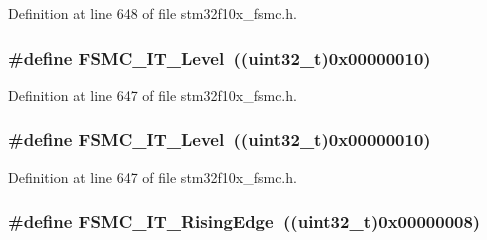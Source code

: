 Definition at line 648 of file stm32f10x\+\_\+fsmc.\+h.

\subsubsection[{\texorpdfstring{F\+S\+M\+C\+\_\+\+I\+T\+\_\+\+Level}{FSMC_IT_Level}}]{\setlength{\rightskip}{0pt plus 5cm}\#define F\+S\+M\+C\+\_\+\+I\+T\+\_\+\+Level~(({\bf uint32\+\_\+t})0x00000010)}\hypertarget{group___f_s_m_c___interrupt__sources_ga59b5839854074008fb36fa86ec50a0c7}{}\label{group___f_s_m_c___interrupt__sources_ga59b5839854074008fb36fa86ec50a0c7}


Definition at line 647 of file stm32f10x\+\_\+fsmc.\+h.

\subsubsection[{\texorpdfstring{F\+S\+M\+C\+\_\+\+I\+T\+\_\+\+Level}{FSMC_IT_Level}}]{\setlength{\rightskip}{0pt plus 5cm}\#define F\+S\+M\+C\+\_\+\+I\+T\+\_\+\+Level~(({\bf uint32\+\_\+t})0x00000010)}\hypertarget{group___f_s_m_c___interrupt__sources_ga59b5839854074008fb36fa86ec50a0c7}{}\label{group___f_s_m_c___interrupt__sources_ga59b5839854074008fb36fa86ec50a0c7}


Definition at line 647 of file stm32f10x\+\_\+fsmc.\+h.

\subsubsection[{\texorpdfstring{F\+S\+M\+C\+\_\+\+I\+T\+\_\+\+Rising\+Edge}{FSMC_IT_RisingEdge}}]{\setlength{\rightskip}{0pt plus 5cm}\#define F\+S\+M\+C\+\_\+\+I\+T\+\_\+\+Rising\+Edge~(({\bf uint32\+\_\+t})0x00000008)}\hypertarget{group___f_s_m_c___interrupt__sources_gac483854bd6f90d8c7899a597a0c0ab1a}{}\label{group___f_s_m_c___interrupt__sources_gac483854bd6f90d8c7899a597a0c0ab1a}


